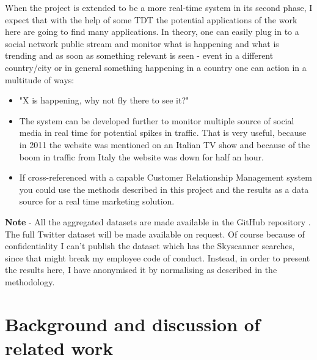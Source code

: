 \documentclass[minf,twoside,singlespacing,parskip,frontabs]{infthesis}
\begin{document}
When the project is extended to be a more real-time system in its second phase, I expect that with the help of some TDT the potential applications of the work here are going to find many applications. In theory, one can easily plug in to a social network public stream and monitor what is happening and what is trending and as soon as something relevant is seen - event in a different country/city or in general something happening in a country one can action in a multitude of ways:


\begin{itemize}
\item "X is happening, why not fly there to see it?"
\item The system can be developed further to monitor multiple source of social media in real time for potential spikes in traffic. That is very useful, because in 2011 the website was mentioned on an Italian TV show and because of the boom in traffic from Italy the website was down for half an hour. 
\item If cross-referenced with a capable Customer Relationship Management system you could use the methods described in this project and the results as a data source for a real time marketing solution.
\end{itemize}




\textbf{Note} - All the aggregated datasets are made available in the GitHub repository \cite{code}.  The full Twitter dataset will be made available on request. Of course because of confidentiality I can't publish the dataset which has the Skyscanner searches, since that might break my employee code of conduct. Instead, in order to present the results here, I have anonymised it by normalising as described in the methodology. 


\section{Background and discussion of related work}
\end{document}
